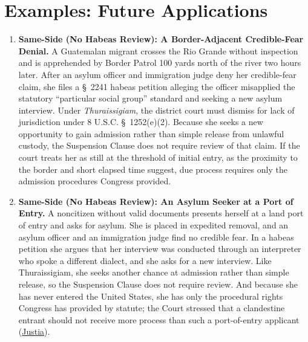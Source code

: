 \documentclass[12pt]{article}
\begin{document}
\section{Examples: Future Applications}
\begin{enumerate}

\item \textbf{Same-Side (No Habeas Review): A Border-Adjacent Credible-Fear Denial.} A Guatemalan migrant crosses the Rio Grande without inspection and is apprehended by Border Patrol 100 yards north of the river two hours later. After an asylum officer and immigration judge deny her credible-fear claim, she files a \S\ 2241 habeas petition alleging the officer misapplied the statutory ``particular social group'' standard and seeking a new asylum interview. Under \textit{Thuraissigiam}, the district court must dismiss for lack of jurisdiction under 8 U.S.C. \S\ 1252(e)(2). Because she seeks a new opportunity to gain admission rather than simple release from unlawful custody, the Suspension Clause does not require review of that claim. If the court treats her as still at the threshold of initial entry, as the proximity to the border and short elapsed time suggest, due process requires only the admission procedures Congress provided.

\item \textbf{Same-Side (No Habeas Review): An Asylum Seeker at a Port of Entry.} A noncitizen without valid documents presents herself at a land port of entry and asks for asylum. She is placed in expedited removal, and an asylum officer and an immigration judge find no credible fear. In a habeas petition she argues that her interview was conducted through an interpreter who spoke a different dialect, and she asks for a new interview. Like Thuraissigiam, she seeks another chance at admission rather than simple release, so the Suspension Clause does not require review. And because she has never entered the United States, she has only the procedural rights Congress has provided by statute; the Court stressed that a clandestine entrant should not receive more process than such a port-of-entry applicant (\href{https://supreme.justia.com/cases/federal/us/591/19-161/}{Justia}).


\end{enumerate}
\end{document}
